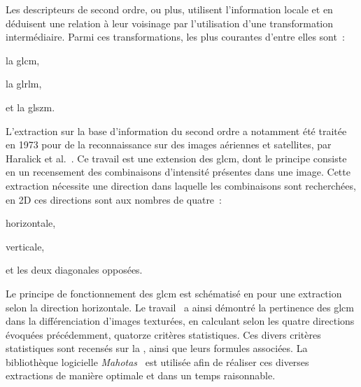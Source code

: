 Les descripteurs de second ordre, ou plus, utilisent l'information locale et en déduisent une relation à leur voisinage par l'utilisation d'une transformation intermédiaire. Parmi ces transformations, les plus courantes d'entre elles sont~: 
\begin{inlinerate}
    \item la \gls{glcm},
    \item la \gls{glrlm},
    \item et la \gls{glszm}.
\end{inlinerate} 
L'extraction sur la base d'information du second ordre a notamment été traitée en 1973 pour de la reconnaissance sur des images aériennes et satellites, par Haralick et al.~\cite{Haralick1973}. Ce travail est une extension des \gls{glcm}, dont le principe consiste en un recensement des combinaisons d'intensité présentes dans une image. Cette extraction nécessite une direction dans laquelle les combinaisons sont recherchées, en 2D ces directions sont aux nombres de quatre~:
\begin{inlinerate}
    \item horizontale,
    \item verticale,
    \item et les deux diagonales opposées.
\end{inlinerate}
Le principe de fonctionnement des \gls{glcm} est schématisé en  pour une extraction selon la direction horizontale. Le travail~\cite{Haralick1973} a ainsi démontré la pertinence des \gls{glcm} dans la différenciation d'images texturées, en calculant selon les quatre directions évoquées précédemment, quatorze critères statistiques. Ces divers critères statistiques sont recensés sur la , ainsi que leurs formules associées. La bibliothèque logicielle \textit{Mahotas}~\cite{coelho2012} est utilisée afin de réaliser ces diverses extractions de manière optimale et dans un temps raisonnable.\par
 
